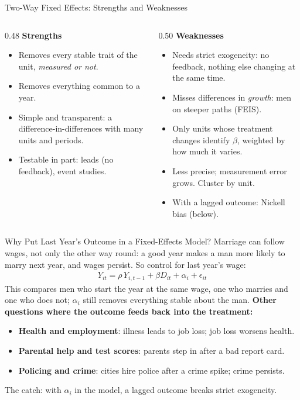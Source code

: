 \documentclass[aspectratio=169,11pt,xcolor=dvipsnames]{beamer}
\newcommand{\core}{\,\raisebox{0.6pt}{\textcolor{corestar}{$\bigstar$}}}
\begin{document}
\begin{frame}{Two-Way Fixed Effects: Strengths and Weaknesses\core}
\begin{columns}[T]
\begin{column}{0.48\linewidth}
\textbf{Strengths}
\begin{itemize}\itemsep3pt
  \item Removes every stable trait of the unit, \emph{measured or not}.
  \item Removes everything common to a year.
  \item Simple and transparent: a difference-in-differences with many units and
        periods.
  \item Testable in part: leads (no feedback), event studies.
\end{itemize}
\end{column}
\begin{column}{0.50\linewidth}
\textbf{Weaknesses}
\begin{itemize}\itemsep3pt
  \item Needs strict exogeneity: no feedback, nothing else changing at the same time.
  \item Misses differences in \emph{growth}: men on steeper paths (FEIS).
  \item Only units whose treatment changes identify $\beta$, weighted by how much
        it varies.
  \item Less precise; measurement error grows. \alert{Cluster by unit.}
  \item With a lagged outcome: Nickell bias (below).
\end{itemize}
\end{column}
\end{columns}
\end{frame}

\begin{frame}{Why Put Last Year's Outcome in a Fixed-Effects Model?}
Marriage can follow wages, not only the other way round: a good year makes a man more
likely to marry next year, and wages persist. So control for last year's wage:
\begin{align*}
  Y_{it} = \rho\, Y_{i,t-1} + \beta D_{it} + \alpha_i + \epsilon_{it}
\end{align*}
This compares men who start the year at the same wage, one who marries and one who does not;
$\alpha_i$ still removes everything stable about the man.
\vskip4pt
\textbf{Other questions where the outcome feeds back into the treatment:}
\begin{itemize}\itemsep2pt
  \item \textbf{Health and employment}: illness leads to job loss; job loss worsens health.
  \item \textbf{Parental help and test scores}: parents step in after a bad report card.
  \item \textbf{Policing and crime}: cities hire police after a crime spike; crime persists.
\end{itemize}
\vskip4pt
The catch: with $\alpha_i$ in the model, a lagged outcome breaks strict exogeneity.
\end{frame}
\end{document}
